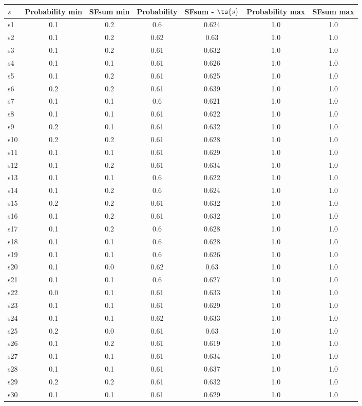 \documentclass{article}
\begin{document}
\noindent\begin{tabular}{|l|c|c|c|c|c|c|}
\hline
$s$& Probability min & SFsum min & Probability & SFsum - $\ts{s}$ & Probability max & SFsum max\\
\hline
s1 &0.1 & 0.2 & 0.6 & 0.624 & 1.0 & 1.0\\
\hline
s2 &0.1 & 0.2 & 0.62 & 0.63 & 1.0 & 1.0\\
\hline
s3 &0.1 & 0.2 & 0.61 & 0.632 & 1.0 & 1.0\\
\hline
s4 &0.1 & 0.1 & 0.61 & 0.626 & 1.0 & 1.0\\
\hline
s5 &0.1 & 0.2 & 0.61 & 0.625 & 1.0 & 1.0\\
\hline
s6 &0.2 & 0.2 & 0.61 & 0.639 & 1.0 & 1.0\\
\hline
s7 &0.1 & 0.1 & 0.6 & 0.621 & 1.0 & 1.0\\
\hline
s8 &0.1 & 0.1 & 0.61 & 0.622 & 1.0 & 1.0\\
\hline
s9 &0.2 & 0.1 & 0.61 & 0.632 & 1.0 & 1.0\\
\hline
s10 &0.2 & 0.2 & 0.61 & 0.628 & 1.0 & 1.0\\
\hline
s11 &0.1 & 0.1 & 0.61 & 0.629 & 1.0 & 1.0\\
\hline
s12 &0.1 & 0.2 & 0.61 & 0.634 & 1.0 & 1.0\\
\hline
s13 &0.1 & 0.1 & 0.6 & 0.622 & 1.0 & 1.0\\
\hline
s14 &0.1 & 0.2 & 0.6 & 0.624 & 1.0 & 1.0\\
\hline
s15 &0.2 & 0.2 & 0.61 & 0.632 & 1.0 & 1.0\\
\hline
s16 &0.1 & 0.2 & 0.61 & 0.632 & 1.0 & 1.0\\
\hline
s17 &0.1 & 0.2 & 0.6 & 0.628 & 1.0 & 1.0\\
\hline
s18 &0.1 & 0.1 & 0.6 & 0.628 & 1.0 & 1.0\\
\hline
s19 &0.1 & 0.1 & 0.6 & 0.626 & 1.0 & 1.0\\
\hline
s20 &0.1 & 0.0 & 0.62 & 0.63 & 1.0 & 1.0\\
\hline
s21 &0.1 & 0.1 & 0.6 & 0.627 & 1.0 & 1.0\\
\hline
s22 &0.0 & 0.1 & 0.61 & 0.633 & 1.0 & 1.0\\
\hline
s23 &0.1 & 0.1 & 0.61 & 0.629 & 1.0 & 1.0\\
\hline
s24 &0.1 & 0.1 & 0.62 & 0.633 & 1.0 & 1.0\\
\hline
s25 &0.2 & 0.0 & 0.61 & 0.63 & 1.0 & 1.0\\
\hline
s26 &0.1 & 0.2 & 0.61 & 0.619 & 1.0 & 1.0\\
\hline
s27 &0.1 & 0.1 & 0.61 & 0.634 & 1.0 & 1.0\\
\hline
s28 &0.1 & 0.1 & 0.61 & 0.637 & 1.0 & 1.0\\
\hline
s29 &0.2 & 0.2 & 0.61 & 0.632 & 1.0 & 1.0\\
\hline
s30 &0.1 & 0.1 & 0.61 & 0.629 & 1.0 & 1.0\\
\hline
\end{tabular}\\
\end{document}

